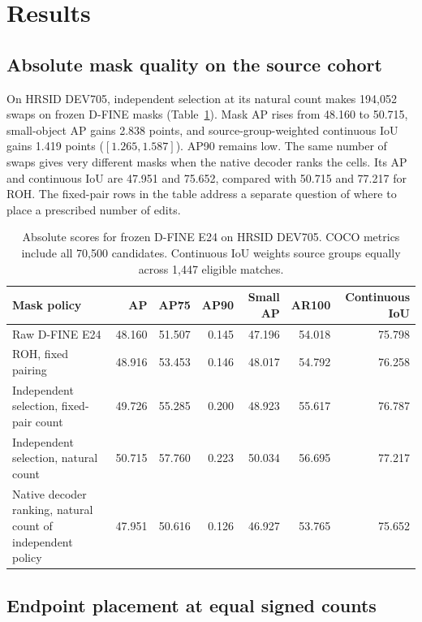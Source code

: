 \documentclass[journal]{IEEEtran}
\begin{document}
\section{Results}
\label{sec:quantitative}

\subsection{Absolute mask quality on the source cohort}
On HRSID DEV705, independent selection at its natural count makes 194,052 swaps on frozen D-FINE masks (Table~\ref{tab:dev}). Mask AP rises from 48.160 to 50.715, small-object AP gains 2.838 points, and source-group-weighted continuous IoU gains 1.419 points (\([1.265,1.587]\)). AP90 remains low. The same number of swaps gives very different masks when the native decoder ranks the cells. Its AP and continuous IoU are 47.951 and 75.652, compared with 50.715 and 77.217 for ROH. The fixed-pair rows in the table address a separate question of where to place a prescribed number of edits.

\begin{table}[t]
\centering
\caption{Absolute scores for frozen D-FINE E24 on HRSID DEV705. COCO metrics include all 70,500 candidates. Continuous IoU weights source groups equally across 1,447 eligible matches.}
\label{tab:dev}
\begin{tabular}{lrrrrrr}
\toprule
Mask policy & AP & AP75 & AP90 & Small AP & AR100 & Continuous IoU\\
\midrule
Raw D-FINE E24 & 48.160 & 51.507 & 0.145 & 47.196 & 54.018 & 75.798\\
ROH, fixed pairing & 48.916 & 53.453 & 0.146 & 48.017 & 54.792 & 76.258\\
Independent selection, fixed-pair count & 49.726 & 55.285 & 0.200 & 48.923 & 55.617 & 76.787\\
\midrule
Independent selection, natural count & 50.715 & 57.760 & 0.223 & 50.034 & 56.695 & 77.217\\
Native decoder ranking, natural count of independent policy & 47.951 & 50.616 & 0.126 & 46.927 & 53.765 & 75.652\\
\bottomrule
\end{tabular}
\end{table}

\subsection{Endpoint placement at equal signed counts}
\label{sec:pairing-effects}
\end{document}

